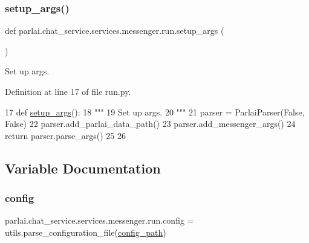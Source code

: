 \subsubsection{\texorpdfstring{setup\+\_\+args()}{setup\_args()}}
{\footnotesize\ttfamily def parlai.\+chat\+\_\+service.\+services.\+messenger.\+run.\+setup\+\_\+args (\begin{DoxyParamCaption}{ }\end{DoxyParamCaption})}

\begin{DoxyVerb}Set up args.
\end{DoxyVerb}
 

Definition at line 17 of file run.\+py.


\begin{DoxyCode}
17 \textcolor{keyword}{def }\hyperlink{namespaceparlai_1_1tasks_1_1talkthewalk_1_1run_a3534e8afa0a4dc25a6e02740fa35ac84}{setup\_args}():
18     \textcolor{stringliteral}{"""}
19 \textcolor{stringliteral}{    Set up args.}
20 \textcolor{stringliteral}{    """}
21     parser = ParlaiParser(\textcolor{keyword}{False}, \textcolor{keyword}{False})
22     parser.add\_parlai\_data\_path()
23     parser.add\_messenger\_args()
24     \textcolor{keywordflow}{return} parser.parse\_args()
25 
26 
\end{DoxyCode}


\subsection{Variable Documentation}
\mbox{\label{namespaceparlai_1_1chat__service_1_1services_1_1messenger_1_1run_aa5dcaaace4024e255bfdbebea518be6d}} 
\subsubsection{\texorpdfstring{config}{config}}
{\footnotesize\ttfamily parlai.\+chat\+\_\+service.\+services.\+messenger.\+run.\+config = utils.\+parse\+\_\+configuration\+\_\+file(\hyperlink{namespaceparlai_1_1chat__service_1_1services_1_1messenger_1_1run_ae0152f9266b964ec0b79975b95f10a27}{config\+\_\+path})}



